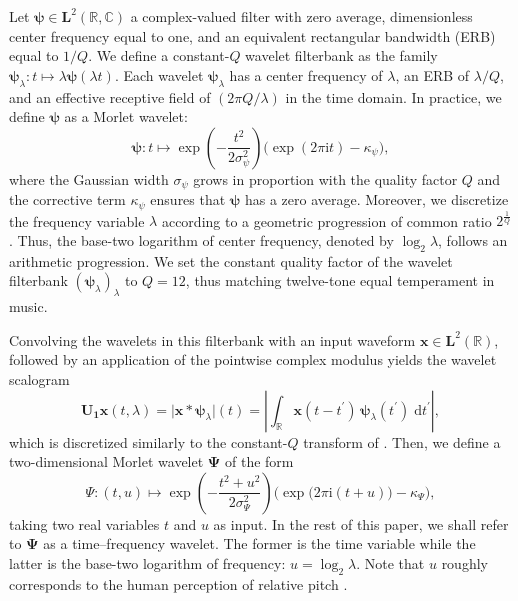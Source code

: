 \documentclass{bmcart}
\begin{document}
Let $\boldsymbol{\psi} \in \mathbf{L}^2(\mathbb{R}, \mathbb{C})$ a complex-valued filter with zero average, dimensionless center frequency equal to one, and an equivalent rectangular bandwidth (ERB) equal to $1/Q$.
We define a constant-$Q$ wavelet filterbank as the family $\boldsymbol{\psi}_{\lambda} : t \mapsto \lambda \boldsymbol{\psi}(\lambda t)$.
Each wavelet $\boldsymbol{\psi}_{\lambda}$ has a center frequency of $\lambda$, an ERB of $\lambda/Q$, and an effective receptive field of $(2\pi Q/\lambda)$ in the time domain.
In practice, we define $\boldsymbol{\psi}$ as a Morlet wavelet:
\begin{equation}
\boldsymbol{\psi}:t \longmapsto \exp\left(-\dfrac{t^2}{2\sigma_{\psi}^2}\right)
\big( \exp\left(2\pi \mathrm{i}t\right) - \kappa_{\psi} \big),
\label{eq:psi}
\end{equation}
where the Gaussian width $\sigma_{\psi}$ grows in proportion with the quality factor $Q$ and the corrective term $\kappa_{\psi}$ ensures that $\boldsymbol{\psi}$ has a zero average.
Moreover, we discretize the frequency variable $\lambda$ according to a geometric progression of common ratio $2^{\frac{1}{Q}}$.
Thus, the base-two logarithm of center frequency, denoted by $\log_2 \lambda$, follows an arithmetic progression.
We set the constant quality factor of the wavelet filterbank $(\boldsymbol{\psi}_\lambda)_\lambda$ to $Q=12$, thus matching twelve-tone equal temperament in music.

Convolving the wavelets in this filterbank with an input waveform $\boldsymbol{x}\in\mathbf{L}^2(\mathbb{R})$, followed by an application of the pointwise complex modulus yields the wavelet scalogram
\begin{equation}
\mathbf{U_1}\boldsymbol{x}(t,\lambda) =
\big\vert
\boldsymbol{x}
\ast
\boldsymbol{\psi}_{\lambda}
\big\vert(t)
=
\left\vert
\int_{\mathbb{R}}
\boldsymbol{x}(t - t^{\prime})
\,
\boldsymbol{\psi}_{\lambda} (t^{\prime})
\;
\mathrm{d}{t^\prime}
\right\vert,
\label{eq:U1}
\end{equation}
which is discretized similarly to the constant-$Q$ transform of \cite{schorkhuber2010smc}.
Then, we define a two-dimensional Morlet wavelet $\boldsymbol{\Psi}$ of the form
\begin{equation}
\Psi : (t, u) \longmapsto
\exp\left(-\dfrac{t^2+u^2}{2\sigma_{\Psi}^2}\right)
\Big( \exp\big(2\pi \mathrm{i} (t + u)\big) - \kappa_{\Psi} \Big),
\label{eq:Psi}
\end{equation}
taking two real variables $t$ and $u$ as input.
In the rest of this paper, we shall refer to $\boldsymbol{\Psi}$ as a time--frequency wavelet.
The former is the time variable while the latter is the base-two logarithm of frequency: $u = \log_2 \lambda$.
Note that $u$ roughly corresponds to the human perception of relative pitch \cite{lostanlen2020icassp}.
\end{document}
